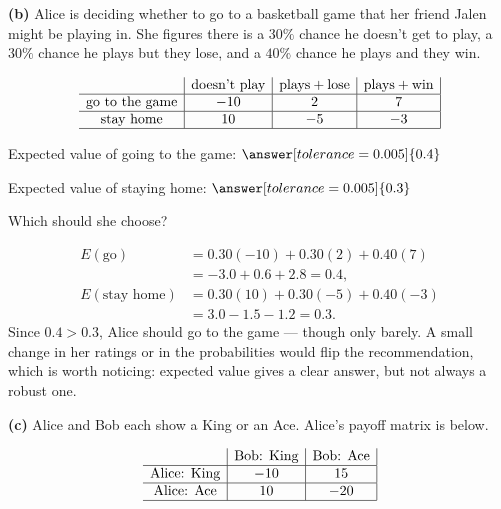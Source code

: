 \documentclass[12pt]{ximera}
\begin{document}
\begin{problem}
\begin{prompt}
\textbf{(b)} Alice is deciding whether to go to a basketball game that her friend
Jalen might be playing in. She figures there is a $30\%$ chance he doesn't get to
play, a $30\%$ chance he plays but they lose, and a $40\%$ chance he plays and they
win.

\[
\begin{array}{c|c|c|c|}
\phantom{|} & \text{doesn't play} & \text{plays}+\text{lose} & \text{plays}+\text{win} \\\hline
\text{go to the game} & -10 & 2 & 7 \\\hline
\text{stay home} & 10 & -5 & -3 \\\hline
\end{array}
\]

Expected value of going to the game: $\answer[tolerance=0.005]{0.4}$

\smallskip
Expected value of staying home: $\answer[tolerance=0.005]{0.3}$

\smallskip
Which should she choose?
\begin{multipleChoice}
\end{multipleChoice}

\begin{feedback}
\begin{align*}
E(\text{go}) &= 0.30(-10) + 0.30(2) + 0.40(7)\\
&= -3.0 + 0.6 + 2.8 = 0.4,\\[4pt]
E(\text{stay home}) &= 0.30(10) + 0.30(-5) + 0.40(-3)\\
&= 3.0 - 1.5 - 1.2 = 0.3.
\end{align*}
Since $0.4 > 0.3$, Alice should go to the game --- though only barely. A small change
in her ratings or in the probabilities would flip the recommendation, which is worth
noticing: expected value gives a clear answer, but not always a robust one.
\end{feedback}
\end{prompt}

\begin{prompt}
\textbf{(c)} Alice and Bob each show a King or an Ace. Alice's payoff matrix is below.

\[
\begin{array}{c|c|c|}
\phantom{|} & \text{Bob: King} & \text{Bob: Ace} \\\hline
\text{Alice: King} & -10 & 15 \\\hline
\text{Alice: Ace} & 10 & -20 \\\hline
\end{array}
\]


\end{prompt}
\end{problem}
\end{document}
